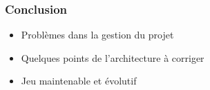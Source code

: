 \begin{frame}

\frametitle{Conclusion}

	
	
	\begin{itemize}
		\item{Problèmes dans la gestion du projet}
	\end{itemize}

	\begin{itemize}
		\item{Quelques points de l'architecture à corriger}
	\end{itemize}

	\begin{itemize}
		\item{Jeu maintenable et évolutif}
	\end{itemize}
	


\end{frame}

